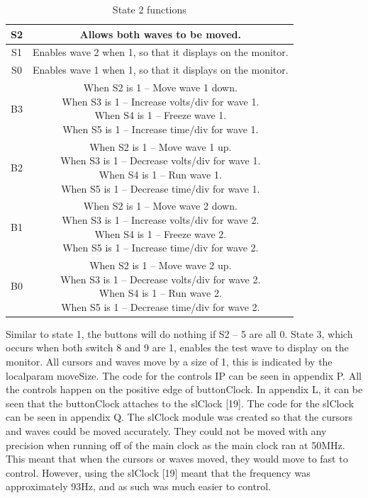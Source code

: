 \documentclass[a4paper,12pt]{article}
\newcommand{\squeezeup}{\vspace{-2.5mm}}
\begin{document}
\begin{flushleft}
\begin{center}
\begin{table}[H]
\begin{tabular}{|c|c|}
	\hline 
	S2 & Allows both waves to be moved. \\ 
	\hline 
	S1 & Enables wave 2 when 1, so that it displays on the monitor.\\ 
	\hline 
	S0 & Enables wave 1 when 1, so that it displays on the monitor. \\ 
	\hline 
	B3 & \makecell{When S2 is 1 – Move wave 1 down.\\
When S3 is 1 – Increase volts/div for wave 1.\\
When S4 is 1 – Freeze wave 1.\\
When S5 is 1 – Increase time/div for wave 1.}
	 \\ 
	\hline 
	B2 & \makecell{When S2 is 1 – Move wave 1 up.\\
When S3 is 1 – Decrease volts/div for wave 1.\\
When S4 is 1 – Run wave 1.\\
When S5 is 1 – Decrease time/div for wave 1.}
	 \\ 
	\hline 
	B1 & \makecell{When S2 is 1 – Move wave 2 down.\\
When S3 is 1 – Increase volts/div for wave 2.\\
When S4 is 1 – Freeze wave 2.\\
When S5 is 1 – Increase time/div for wave 2.\\
} \\
	\hline 
	B0 & \makecell{When S2 is 1 – Move wave 2 up.\\
When S3 is 1 – Decrease volts/div for wave 2.\\
When S4 is 1 – Run wave 2.\\
When S5 is 1 – Decrease time/div for wave 2.\\
}
	 \\ 
	\hline 
	\end{tabular} 
	\caption{State 2 functions}
\end{table}
\end{center}
\squeezeup
Similar to state 1, the buttons will do nothing if S2 – 5 are all 0. State 3, which occurs when both switch 8 and 9 are 1, enables the test wave to display on the monitor. All cursors and waves move by a size of 1, this is indicated by the localparam moveSize. 
The code for the controls IP can be seen in appendix P. All the controls happen on the positive edge of buttonClock. In appendix L, it can be seen that the buttonClock attaches to the slClock [19]. The code for the slClock can be seen in appendix Q. The slClock module was created so that the cursors and waves could be moved accurately. They could not be moved with any precision when running off of the main clock as the main clock ran at 50MHz. This meant that when the cursors or waves moved, they would move to fast to control. However, using the slClock [19] meant that the frequency was approximately 93Hz, and as such was much easier to control.
\end{flushleft}
\newpage
\end{document}
